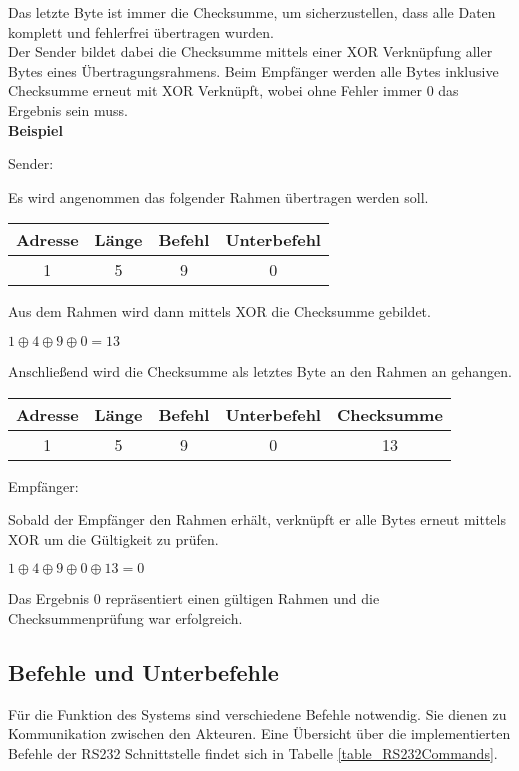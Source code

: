 Das letzte Byte ist immer die Checksumme, um sicherzustellen, dass alle Daten komplett und fehlerfrei übertragen wurden.\\
Der Sender bildet dabei die Checksumme mittels einer XOR Verknüpfung aller Bytes eines Übertragungsrahmens. Beim Empfänger werden alle Bytes inklusive Checksumme erneut mit XOR Verknüpft, wobei ohne Fehler immer 0 das Ergebnis sein muss.\\


\textbf{Beispiel}

Sender:
 
Es wird angenommen das folgender Rahmen übertragen werden soll.
\begin{center}
\begin{tabular}{|c|c|c|c|}\hline
  Adresse & Länge & Befehl & Unterbefehl \\ \hline
  1 & 5 & 9 & 0 \\ \hline
\end{tabular}
\end{center}
Aus dem Rahmen wird dann mittels XOR die Checksumme gebildet.

\begin{center}
{\Large$1 \oplus 4 \oplus 9 \oplus 0 = 13$}\\
\end{center}

Anschließend wird die Checksumme als letztes Byte an den Rahmen an gehangen.
\begin{center}
\begin{tabular}{|c|c|c|c|c|}\hline
  Adresse & Länge & Befehl & Unterbefehl & Checksumme \\ \hline
  1 & 5 & 9 & 0 & 13 \\ \hline
\end{tabular}
\end{center}

Empfänger:

Sobald der Empfänger den Rahmen erhält, verknüpft er alle Bytes erneut mittels XOR um die Gültigkeit zu prüfen.

\begin{center}
{\Large $1 \oplus 4 \oplus 9 \oplus 0 \oplus 13 = 0$}\\
\end{center}

Das Ergebnis 0 repräsentiert einen gültigen Rahmen und die Checksummenprüfung war erfolgreich.


\subsection{Befehle und Unterbefehle}
\label{section_BefehleUnterbefehle}
Für die Funktion des Systems sind verschiedene Befehle notwendig. Sie dienen zu Kommunikation zwischen den Akteuren.
Eine Übersicht über die implementierten Befehle der RS232 Schnittstelle findet sich in Tabelle \ref{table_RS232Commands}.\\

